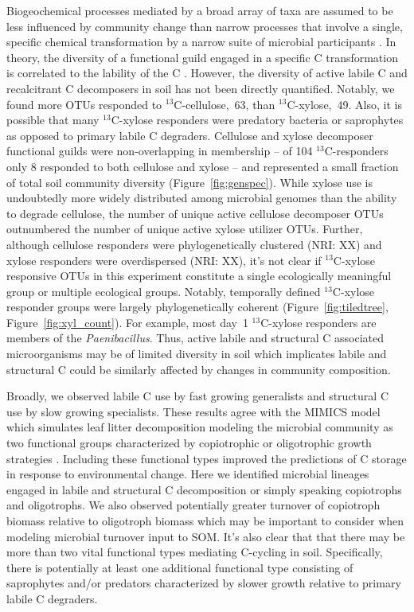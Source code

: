 Biogeochemical processes mediated by a broad array of taxa are assumed to
be less influenced by community change than narrow processes that involve
a single, specific chemical transformation by a narrow suite of microbial
participants \citep{Schimel_1995,McGuire2010}. In theory, the diversity of
a functional guild engaged in a specific C transformation is correlated to the
lability of the C \citep{McGuire2010}. However, the diversity of active
labile C and recalcitrant C decomposers in soil has not been directly
quantified. Notably, we found more OTUs responded to $^{13}$C-cellulose,~63,
than $^{13}$C-xylose,~49. Also, it is possible that many $^{13}$C-xylose
responders were predatory bacteria or saprophytes as opposed to primary labile
C degraders. Cellulose and xylose decomposer functional guilds were
non-overlapping in membership -- of 104 $^{13}$C-responders only 8 responded to
both cellulose and xylose -- and represented a small fraction of total soil
community diversity (Figure~\ref{fig:genspec}). While xylose use is undoubtedly
more widely distributed among microbial genomes than the ability to degrade
cellulose, the number of unique active cellulose decomposer OTUs outnumbered
the number of unique active xylose utilizer OTUs. Further, although cellulose
responders were phylogenetically clustered (NRI: XX) and xylose responders were
overdispersed (NRI: XX), it's not clear if $^{13}$C-xylose responsive OTUs in
this experiment constitute a single ecologically meaningful group or multiple
ecological groups. Notably, temporally defined $^{13}$C-xylose responder groups
were largely phylogenetically coherent (Figure~\ref{fig:tiledtree},
Figure~\ref{fig:xyl_count}). For example, most day~1 $^{13}$C-xylose responders
are members of the \textit{Paenibacillus}. Thus, active labile and structural
C associated microorganisms may be of limited diversity in soil which
implicates labile and structural C could be similarly affected by changes in
community composition. 

Broadly, we observed labile C use by fast growing generalists and structural
C use by slow growing specialists. These results agree with the MIMICS model
which simulates leaf litter decomposition modeling the microbial community as
two functional groups characterized by copiotrophic or oligotrophic growth
strategies \citep{wieder_2014a}. Including these functional types improved the
predictions of C storage in response to environmental change. Here we
identified microbial lineages engaged in labile and
structural C decomposition or simply speaking copiotrophs and oligotrophs. We
also observed potentially greater turnover of copiotroph biomass relative to
oligotroph biomass which may be important to consider when modeling microbial
turnover input to SOM. It's also clear that that there may be more than two
vital functional types mediating C-cycling in soil. Specifically, there is
potentially at least one additional functional type consisting of 
saprophytes and/or predators characterized by slower growth relative to primary
labile C degraders. 


